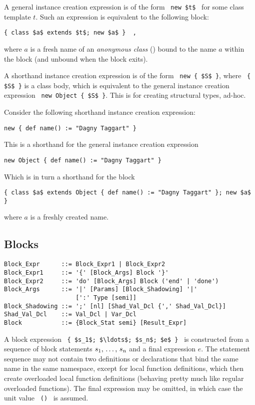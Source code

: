 A general instance creation expression is of the form ~\lstinline!new $t$!~ for some class template $t$. Such an expression is equivalent to the following block:
\begin{lstlisting}
{ class $a$ extends $t$; new $a$ }  ,
\end{lstlisting}
where $a$ is a fresh name of an {\em anonymous class} () bound to the name $a$ within the block (and unbound when the block exits).

A shorthand instance creation expression is of the form ~\lstinline!new { $S$ }!, where ~\lstinline!{ $S$ }! is a class body, which is equivalent to the general instance creation expression ~\lstinline!new Object { $S$ }!. This is for creating structural types, ad-hoc. 

\example Consider the following shorthand instance creation expression:
\begin{lstlisting}
new { def name() := "Dagny Taggart" }
\end{lstlisting}
This is a shorthand for the general instance creation expression
\begin{lstlisting}
new Object { def name() := "Dagny Taggart" }
\end{lstlisting}
Which is in turn a shorthand for the block
\begin{lstlisting}
{ class $a$ extends Object { def name() := "Dagny Taggart" }; new $a$ }
\end{lstlisting}
where $a$ is a freshly created name. 




\subsection{Blocks}
\label{sec:blocks}

\syntax\begin{lstlisting}
Block_Expr      ::= Block_Expr1 | Block_Expr2
Block_Expr1     ::= '{' [Block_Args] Block '}'
Block_Expr2     ::= 'do' [Block_Args] Block ('end' | 'done')
Block_Args      ::= '|' [Params] [Block_Shadowing] '|' 
                    [':' Type [semi]]
Block_Shadowing ::= ';' [nl] [Shad_Val_Dcl {',' Shad_Val_Dcl}]
Shad_Val_Dcl    ::= Val_Dcl | Var_Dcl
Block           ::= {Block_Stat semi} [Result_Expr]
\end{lstlisting}

A block expression ~\lstinline!{ $s_1$; $\ldots$; $s_n$; $e$ }!~ is constructed from a sequence of block statements $s_1 ,\, \ldots ,\, s_n$ and a final expression $e$. The statement sequence may not contain two definitions or declarations that bind the same name in the same namespace, except for local function definitions, which then create overloaded local function definitions (behaving pretty much like regular overloaded functions). The final expression may be omitted, in which case the unit value ~\lstinline!()!~ is assumed. 

